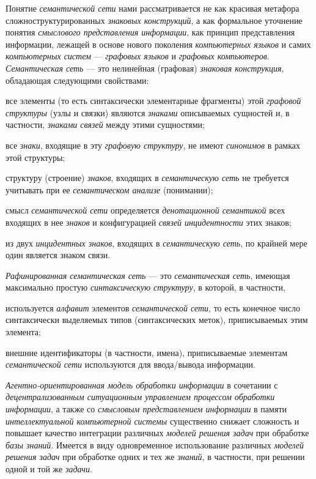Понятие \textit{семантической сети} нами рассматривается не как красивая метафора сложноструктурированных \textit{знаковых конструкций}, а как формальное уточнение понятия \textit{смыслового представления информации}, как принцип представления информации, лежащей в основе нового поколения \textit{компьютерных языков} и самих \textit{компьютерных систем} --- \textit{графовых языков} и \textit{графовых компьютеров}. \textit{Семантическая сеть} --- это нелинейная (графовая) \textit{знаковая конструкция}, обладающая следующими свойствами:

\begin{textitemize}
	\item все элементы (то есть синтаксически элементарные фрагменты) этой \textit{графовой структуры} (узлы и связки) являются \textit{знаками} описываемых сущностей и, в частности, \textit{знаками связей} между этими сущностями;
	\item все \textit{знаки}, входящие в эту \textit{графовую структуру}, не имеют \textit{синонимов} в рамках этой структуры;
	\item {} структуру (строение) \textit{знаков}, входящих в \textit{семантическую сеть} не требуется учитывать при ее \textit{семантическом анализе} (понимании);
	\item смысл \textit{семантической сети} определяется \textit{денотационной семантикой} всех входящих в нее \textit{знаков} и конфигурацией \textit{связей инцидентности} этих знаков;
	\item из двух \textit{инцидентных знаков}, входящих в \textit{семантическую сеть}, по крайней мере один является знаком связи.
\end{textitemize}

\textit{Рафинированная семантическая сеть} --- это \textit{семантическая сеть}, имеющая максимально простую \textit{синтаксическую структуру}, в которой, в частности,

\begin{textitemize}
	\item используется  \textit{алфавит} элементов \textit{семантической сети}, то есть конечное число синтаксически выделяемых типов (синтаксических меток), приписываемых этим элемента;
	\item внешние идентификаторы (в частности, имена), приписываемые элементам \textit{семантической сети} используются  для ввода/вывода информации.
\end{textitemize}

\textit{Агентно-ориентированная модель обработки информации} в сочетании с \textit{децентрализованным ситуационным управлением процессом обработки информации}, а также со \textit{смысловым представлением информации} в памяти \textit{интеллектуальной компьютерной системы} существенно снижает сложность и повышает качество интеграции различных \textit{моделей решения задач} при обработке  \textit{базы знаний}. Имеется в виду одновременное использование различных \textit{моделей решения задач} при обработке одних и тех же \textit{знаний}, в частности, при решении одной и той же \textit{задачи}.

